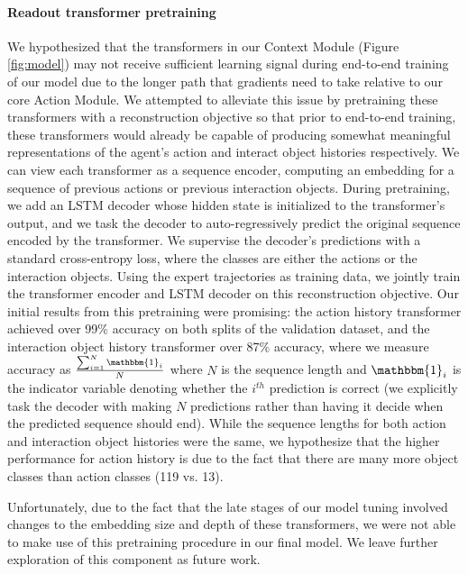 \documentclass[11pt,a4paper]{article}
\begin{document}
\paragraph{Readout transformer pretraining}
We hypothesized that the transformers in our Context Module (Figure \ref{fig:model}) may not receive sufficient learning signal during end-to-end training of our model due to the longer path that gradients need to take relative to our core Action Module. We attempted to alleviate this issue by pretraining these transformers with a reconstruction objective so that prior to end-to-end training, these transformers would already be capable of producing somewhat meaningful representations of the agent's action and interact object histories respectively. We can view each transformer as a sequence encoder, computing an embedding for a sequence of previous actions or previous interaction objects. During pretraining, we add an LSTM decoder whose hidden state is initialized to the transformer's output, and we task the decoder to auto-regressively predict the original sequence encoded by the transformer. We supervise the decoder's predictions with a standard cross-entropy loss, where the classes are either the actions or the interaction objects. Using the expert trajectories as training data, we jointly train the transformer encoder and LSTM decoder on this reconstruction objective. Our initial results from this pretraining were promising: the action history transformer achieved over 99\% accuracy on both splits of the validation dataset, and the interaction object history transformer over 87\% accuracy, where we measure accuracy as $\frac{\sum_{i=1}^N \mathbbm{1}_i}{N}$ where $N$ is the sequence length and $\mathbbm{1}_i$ is the indicator variable denoting whether the $i^{th}$ prediction is correct (we explicitly task the decoder with making $N$ predictions rather than having it decide when the predicted sequence should end). While the sequence lengths for both action and interaction object histories were the same, we hypothesize that the higher performance for action history is due to the fact that there are many more object classes than action classes (119 vs. 13). 

Unfortunately, due to the fact that the late stages of our model tuning involved changes to the embedding size and depth of these transformers, we were not able to make use of this pretraining procedure in our final model. We leave further exploration of this component as future work.
\end{document}
